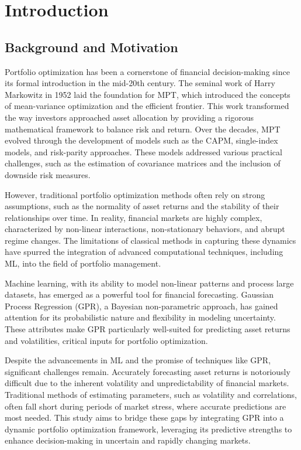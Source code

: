 

\chapter{Introduction}\label{chapter:introduction}

\section{Background and Motivation}
Portfolio optimization has been a cornerstone of financial decision-making since its formal introduction in the mid-20th century. The seminal work of Harry Markowitz in 1952 laid the foundation for \ac{MPT}, which introduced the concepts of mean-variance optimization and the efficient frontier. This work transformed the way investors approached asset allocation by providing a rigorous mathematical framework to balance risk and return. Over the decades, \ac{MPT} evolved through the development of models such as the \ac{CAPM}, single-index models, and risk-parity approaches. These models addressed various practical challenges, such as the estimation of covariance matrices and the inclusion of downside risk measures.

However, traditional portfolio optimization methods often rely on strong assumptions, such as the normality of asset returns and the stability of their relationships over time. In reality, financial markets are highly complex, characterized by non-linear interactions, non-stationary behaviors, and abrupt regime changes. The limitations of classical methods in capturing these dynamics have spurred the integration of advanced computational techniques, including \ac{ML}, into the field of portfolio management.

Machine learning, with its ability to model non-linear patterns and process large datasets, has emerged as a powerful tool for financial forecasting. Gaussian Process Regression (GPR), a Bayesian non-parametric approach, has gained attention for its probabilistic nature and flexibility in modeling uncertainty. These attributes make GPR particularly well-suited for predicting asset returns and volatilities, critical inputs for portfolio optimization.

Despite the advancements in \ac{ML} and the promise of techniques like \ac{GPR}, significant challenges remain. Accurately forecasting asset returns is notoriously difficult due to the inherent volatility and unpredictability of financial markets. Traditional methods of estimating parameters, such as volatility and correlations, often fall short during periods of market stress, where accurate predictions are most needed. This study aims to bridge these gaps by integrating \ac{GPR} into a dynamic portfolio optimization framework, leveraging its predictive strengths to enhance decision-making in uncertain and rapidly changing markets.


